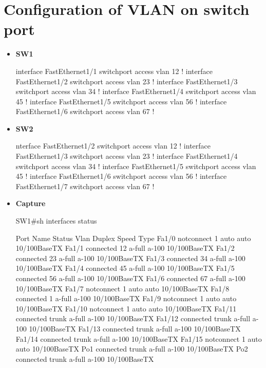 \documentclass[10pt]{article}
\begin{document}
\section{Configuration of VLAN on switch port}
\begin{itemize}
\item {\bf SW1}
\begin{verbatim*}
interface FastEthernet1/1
 switchport access vlan 12
!
interface FastEthernet1/2
 switchport access vlan 23
!
interface FastEthernet1/3
 switchport access vlan 34
!
interface FastEthernet1/4
 switchport access vlan 45
!
interface FastEthernet1/5
 switchport access vlan 56
!
interface FastEthernet1/6
 switchport access vlan 67
!

\end{verbatim*}
\item {\bf SW2}
\begin{verbatim*}
nterface FastEthernet1/2
 switchport access vlan 12
!
interface FastEthernet1/3
 switchport access vlan 23
!
interface FastEthernet1/4
 switchport access vlan 34
!
interface FastEthernet1/5
 switchport access vlan 45
!
interface FastEthernet1/6
 switchport access vlan 56
!
interface FastEthernet1/7
 switchport access vlan 67
!
\end{verbatim*}
\item {\bf Capture}
\begin{verbatim*}
SW1#sh interfaces status

Port    Name               Status       Vlan       Duplex Speed Type
Fa1/0                      notconnect   1            auto    auto 10/100BaseTX
Fa1/1                      connected    12         a-full   a-100 10/100BaseTX
Fa1/2                      connected    23         a-full   a-100 10/100BaseTX
Fa1/3                      connected    34         a-full   a-100 10/100BaseTX
Fa1/4                      connected    45         a-full   a-100 10/100BaseTX
Fa1/5                      connected    56         a-full   a-100 10/100BaseTX
Fa1/6                      connected    67         a-full   a-100 10/100BaseTX
Fa1/7                      notconnect   1            auto    auto 10/100BaseTX
Fa1/8                      connected    1          a-full   a-100 10/100BaseTX
Fa1/9                      notconnect   1            auto    auto 10/100BaseTX
Fa1/10                     notconnect   1            auto    auto 10/100BaseTX
Fa1/11                     connected    trunk      a-full   a-100 10/100BaseTX
Fa1/12                     connected    trunk      a-full   a-100 10/100BaseTX
Fa1/13                     connected    trunk      a-full   a-100 10/100BaseTX
Fa1/14                     connected    trunk      a-full   a-100 10/100BaseTX
Fa1/15                     notconnect   1            auto    auto 10/100BaseTX
Po1                        connected    trunk      a-full   a-100 10/100BaseTX
Po2                        connected    trunk      a-full   a-100 10/100BaseTX



\end{verbatim*}
\end{itemize}
\end{document}
